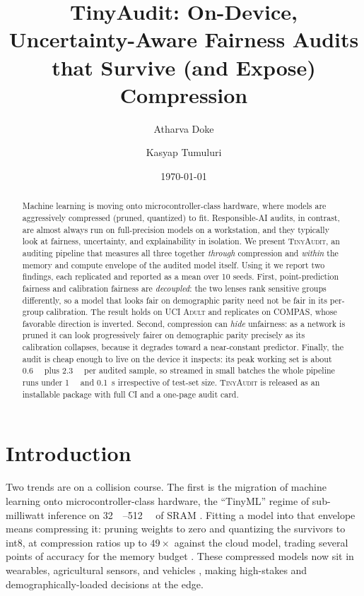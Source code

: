\documentclass[11pt]{article}
\title{TinyAudit: On-Device, Uncertainty-Aware Fairness Audits\\
that Survive (and Expose) Compression}
\author{Atharva Doke \and Kasyap Tumuluri}
\date{\today}
\newcommand{\dataset}[1]{\textsc{#1}}
\begin{document}
\maketitle

\begin{abstract}
Machine learning is moving onto microcontroller-class hardware, where models are
aggressively compressed (pruned, quantized) to fit. Responsible-AI audits, in
contrast, are almost always run on full-precision models on a workstation, and
they typically look at fairness, uncertainty, and explainability in isolation. We
present \textsc{TinyAudit}, an auditing pipeline that measures all three together
\emph{through} compression and \emph{within} the memory and compute envelope of
the audited model itself. Using it we report two findings, each replicated and
reported as a mean over 10 seeds. First, point-prediction fairness and
calibration fairness are \emph{decoupled}: the two lenses rank sensitive groups
differently, so a model that looks fair on demographic parity need not be fair in
its per-group calibration. The result holds on \dataset{UCI Adult} and replicates
on \dataset{COMPAS}, whose favorable direction is inverted. Second, compression
can \emph{hide} unfairness: as a network is pruned it can look progressively
fairer on demographic parity precisely as its calibration collapses, because it
degrades toward a near-constant predictor. Finally, the audit is cheap enough to
live on the device it inspects: its peak working set is about \SI{0.6}{\mega\byte}
plus \SI{2.3}{\kilo\byte} per audited sample, so streamed in small batches the
whole pipeline runs under \SI{1}{\mega\byte} and \SI{0.1}{\second} irrespective
of test-set size. \textsc{TinyAudit} is released as an installable package with
full CI and a one-page audit card.
\end{abstract}

\section{Introduction}
\label{sec:intro}

Two trends are on a collision course. The first is the migration of machine
learning onto microcontroller-class hardware, the ``TinyML'' regime of
sub-milliwatt inference on \SIrange{32}{512}{\kilo\byte} of SRAM
\cite{somvanshi2025tinydl,heydari2025tinyml}. Fitting a model into that envelope
means compressing it: pruning weights to zero and quantizing the survivors to
int8, at compression ratios up to $49\times$ against the cloud model, trading
several points of accuracy for the memory budget \cite{heydari2025tinyml}. These
compressed models now sit in wearables, agricultural sensors, and vehicles
\cite{hayajneh2024agriculture,mohammad2025iot}, making high-stakes and
demographically-loaded decisions at the edge.
\end{document}
